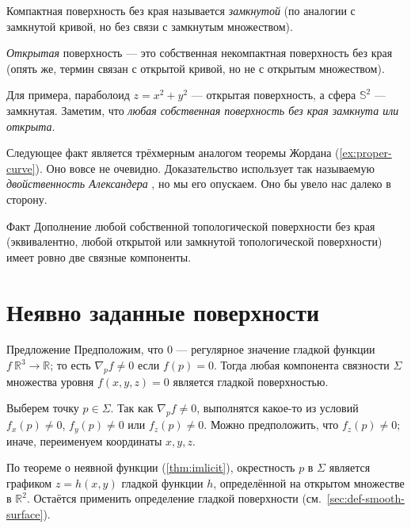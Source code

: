{\sloppy

Компактная поверхность без края называется \emph{замкнутой}
(по аналогии с замкнутой кривой, но без связи с замкнутым множеством).

}

\emph{Открытая} поверхность --- это
собственная некомпактная поверхность без края 
(опять же, термин связан с открытой кривой, но не с открытым множеством).

Для примера, параболоид $z=x^2+y^2$ --- открытая поверхность,
а сфера $\mathbb{S}^2$ --- замкнутая.
Заметим, что \textit{любая собственная поверхность без края замкнута или открыта}.

Следующее факт является трёхмерным аналогом теоремы Жордана (\ref{ex:proper-curve}).
Оно вовсе не очевидно.
Доказательство использует так называемую {}\emph{двойственность Александера} \cite{hatcher}, но мы его опускаем.
Оно бы увело нас далеко в сторону.

\begin{thm}{Факт}\label{clm:proper-divides}
Дополнение любой собственной топологической поверхности без края (эквивалентно, любой открытой или замкнутой топологической поверхности) имеет ровно две связные компоненты.
\end{thm}


\section{Неявно заданные поверхности}

\begin{thm}{Предложение}\label{prop:implicit-surface}
Предположим, что $0$ --- регулярное значение гладкой функции $f\:\mathbb{R}^3\to \mathbb{R}$;
то есть $\nabla_p f\ne 0$ если $f(p)=0$.
Тогда любая компонента связности $\Sigma$ множества уровня $f(x,y,z)=0$ является гладкой поверхностью.
\end{thm}

Выберем точку $p\in\Sigma$.
Так как $\nabla_p f\ne 0$, выполнятся какое-то из условий 
$f_x(p)\ne 0$,
$f_y(p)\ne 0$ или
$f_z(p)\ne 0$.
Можно предположить, что $f_z(p)\ne 0$;
иначе, переименуем координаты $x,y,z$.

По теореме о неявной функции (\ref{thm:imlicit}), окрестность $p$ в $\Sigma$ является графиком $z=h(x,y)$ гладкой функции $h$, определённой на открытом множестве в $\mathbb{R}^2$.
Остаётся применить определение гладкой поверхности (см.~\ref{sec:def-smooth-surface}).
\qeds

